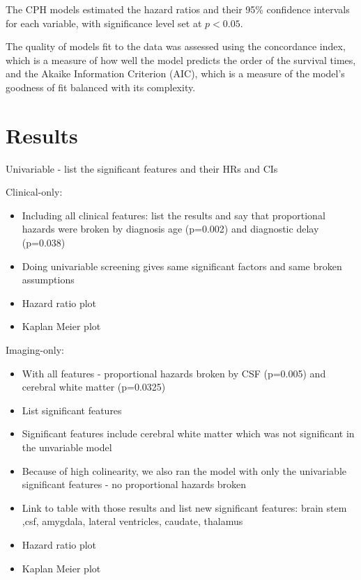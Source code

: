 The CPH models estimated the hazard ratios and their 95\% confidence intervals for each variable, with significance level set at $p<0.05$.

The quality of models fit to the data was assessed using the concordance index, which is a measure of how well the model predicts the order of the survival times, and the Akaike Information Criterion (AIC), which is a measure of the model's goodness of fit balanced with its complexity.

\section{Results}



Univariable
- list the significant features and their HRs and CIs

Clinical-only:
\begin{itemize}
    \item Including all clinical features: list the results and say that proportional hazards were broken by diagnosis age (p=0.002) and diagnostic delay (p=0.038)
    \item Doing univariable screening gives same significant factors and same broken assumptions
    \item Hazard ratio plot
    \item Kaplan Meier plot
\end{itemize}

Imaging-only:
\begin{itemize}
    \item With all features - proportional hazards broken by CSF (p=0.005) and cerebral white matter (p=0.0325)
    \item List significant features
    \item Significant features include cerebral white matter which was not significant in the unvariable model
    \item Because of high colinearity, we also ran the model with only the univariable significant features - no proportional hazards broken
    \item Link to table with those results and list new significant features: brain stem ,csf, amygdala, lateral ventricles, caudate, thalamus
    \item Hazard ratio plot
    \item Kaplan Meier plot
\end{itemize}

